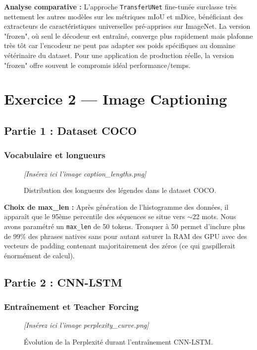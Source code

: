 \documentclass[12pt, a4paper]{article}
\begin{document}
\textbf{Analyse comparative :} L'approche \texttt{TransferUNet} fine-tunée surclasse très nettement les autres modèles sur les métriques mIoU et mDice, bénéficiant des extracteurs de caractéristiques universelles pré-apprises sur ImageNet. La version "frozen", où seul le décodeur est entraîné, converge plus rapidement mais plafonne très tôt car l'encodeur ne peut pas adapter ses poids spécifiques au domaine vétérinaire du dataset. Pour une application de production réelle, la version "frozen" offre souvent le compromis idéal performance/temps.

\newpage
\section{Exercice 2 — Image Captioning}

\subsection{Partie 1 : Dataset COCO}

\subsubsection*{Vocabulaire et longueurs}
\begin{figure}[H]
    \centering
    \textit{[Insérez ici l'image caption\_lengths.png]}
    \caption{Distribution des longueurs des légendes dans le dataset COCO.}
\end{figure}

\textbf{Choix de max\_len :} Après génération de l'histogramme des données, il apparaît que le 95ème percentile des séquences se situe vers $\sim$22 mots. Nous avons paramétré un \texttt{max\_len} de 50 tokens. Tronquer à 50 permet d'inclure plus de 99\% des phrases natives sans pour autant saturer la RAM des GPU avec des vecteurs de padding contenant majoritairement des zéros (ce qui gaspillerait énormément de calcul).

\subsection{Partie 2 : CNN-LSTM}

\subsubsection*{Entraînement et Teacher Forcing}
\begin{figure}[H]
    \centering
    \textit{[Insérez ici l'image perplexity\_curve.png]}
    \caption{Évolution de la Perplexité durant l'entraînement CNN-LSTM.}
\end{figure}
\end{document}
